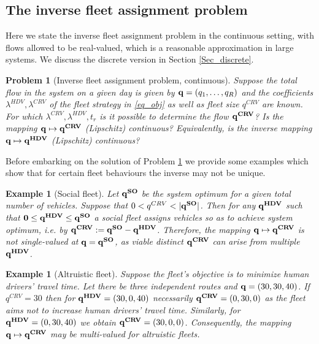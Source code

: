 \documentclass[a4paper,11pt]{article}
\newtheorem{example}[theorem]{Example}
\newtheorem{problem}[theorem]{Problem}
\begin{document}
\subsection{The inverse fleet assignment problem}
Here we state the inverse fleet assignment problem in the continuous setting, with flows allowed to be real-valued, which is a reasonable approximation in large systems. We discuss the discrete version in Section \ref{Sec_discrete}.

\begin{problem}[Inverse fleet assignment problem, continuous]
\label{problem_inverse}
Suppose the total flow in the system on a given day is given by $\bold{q} = (q_1, \dots, q_R)$ and the coefficients $\lambda^{HDV}, \lambda^{CRV}$ of the fleet strategy in \eqref{eq_obj} as well as fleet size $q^{CRV}$ are known. For which $\lambda^{CRV}, \lambda^{HDV}, t_r$ is it possible to determine the flow $\bold{q^{CRV}}$? Is the mapping $\bold{q} \mapsto \bold{q^{CRV}}$ (Lipschitz) continuous? Equivalently, is the inverse mapping $\bold{q} \mapsto \bold{q^{HDV}}$ (Lipschitz) continuous?
\end{problem}

Before embarking on the solution of Problem \ref{problem_inverse} we provide some examples which show that for certain fleet behaviours the inverse may not be 
unique.

\begin{example}[Social fleet]
\label{ex_social}
Let $\bold{q^{SO}}$ be the system optimum for a given total number of vehicles. Suppose that $0 < q^{CRV} < |\bold{q^{SO}}|$. Then for any $\bold{q^{HDV}}$ such that $\bold{0} \le \bold{q^{HDV}} \le \bold{q^{SO}}$ a social fleet assigns vehicles so as to achieve system optimum, i.e.  by $\bold{q^{CRV}} := \bold{q^{SO}} - \bold{q^{HDV}}$. Therefore, the mapping $\bold{q} \mapsto \bold{q^{CRV}}$ is not single-valued at $\bold{q} = \bold{q^{SO}}$, as viable distinct $\bold{q^{CRV}}$ can arise from multiple $\bold{q^{HDV}}$.
\end{example}
\begin{example}[Altruistic fleet]
\label{ex_altruistic}
Suppose the fleet's objective is to minimize human drivers' travel time. Let there be three independent routes and $\bold{q} = (30, 30, 40)$. If $q^{CRV} = 30$ then for $\bold{q^{HDV}} = (30, 0, 40)$ necessarily $\bold{q^{CRV}} = (0, 30, 0)$ as the fleet aims not to increase human drivers' travel time. Similarly, for $\bold{q^{HDV}} = (0, 30, 40)$ we obtain $\bold{q^{CRV}} = (30, 0, 0)$. Consequently, the mapping $\bold{q} \mapsto \bold{q^{CRV}}$ may be multi-valued for altruistic fleets.
\end{example}
\end{document}
